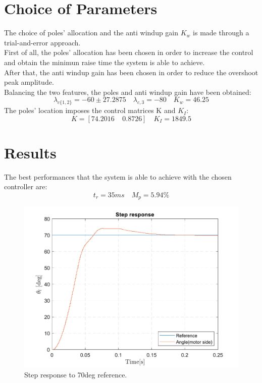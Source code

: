 \documentclass[11pt]{article}
\begin{document}
\section{Choice of Parameters}
The choice of poles' allocation and the anti windup gain $K_w$ is made through a trial-and-error approach.\\
First of all, the poles' allocation has been chosen in order to increase the control and obtain the minimun raise time the system is able to achieve.\\
After that, the anti windup gain has been chosen in order to reduce the overshoot peak amplitude.\\
Balancing the two features, the poles and anti windup gain have been obtained:
	\begin{equation}
		\lambda_{c\{1,2\}} =-60 \pm 27.2875    \quad  \lambda_{c,3}=-80   \quad K_w = 46.25
	\end{equation} 
The poles' location imposes the control matrices K and $K_I$:
	\begin{equation}
		K = [74.2016 \:\:\:\:\:  0.8726] \quad K_I = 1849.5
	\end{equation} 


\section{Results}
The best performances that the system is able to achieve with the chosen controller are:
	\begin{equation}
		t_r = 35ms \quad M_p = 5.94\%
	\end{equation} 
    \vspace{-30pt}
	\begin{figure}[h!]
		\centering\includegraphics[scale=0.3]{images/Step_Response_Challenge}
		\vspace{-10pt}
		\caption{Step response to 70deg reference.}
	\end{figure}
\vspace{-20pt}
\end{document}
